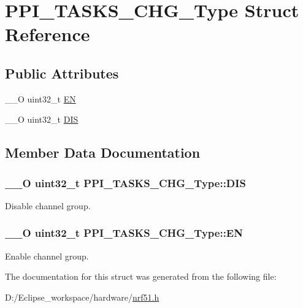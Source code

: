 \hypertarget{struct_p_p_i___t_a_s_k_s___c_h_g___type}{}\section{P\+P\+I\+\_\+\+T\+A\+S\+K\+S\+\_\+\+C\+H\+G\+\_\+\+Type Struct Reference}
\label{struct_p_p_i___t_a_s_k_s___c_h_g___type}
\subsection*{Public Attributes}
\begin{DoxyCompactItemize}
\item 
\+\_\+\+\_\+\+O uint32\+\_\+t \hyperlink{struct_p_p_i___t_a_s_k_s___c_h_g___type_ac25a33f2a32c9f7e6d4f6783a24936c3}{E\+N}
\item 
\+\_\+\+\_\+\+O uint32\+\_\+t \hyperlink{struct_p_p_i___t_a_s_k_s___c_h_g___type_a6197e7d3395fd93e920150ad965ff7d3}{D\+I\+S}
\end{DoxyCompactItemize}


\subsection{Member Data Documentation}
\hypertarget{struct_p_p_i___t_a_s_k_s___c_h_g___type_a6197e7d3395fd93e920150ad965ff7d3}{}
\subsubsection[{D\+I\+S}]{\setlength{\rightskip}{0pt plus 5cm}\+\_\+\+\_\+\+O uint32\+\_\+t P\+P\+I\+\_\+\+T\+A\+S\+K\+S\+\_\+\+C\+H\+G\+\_\+\+Type\+::\+D\+I\+S}\label{struct_p_p_i___t_a_s_k_s___c_h_g___type_a6197e7d3395fd93e920150ad965ff7d3}
Disable channel group. \hypertarget{struct_p_p_i___t_a_s_k_s___c_h_g___type_ac25a33f2a32c9f7e6d4f6783a24936c3}{}
\subsubsection[{E\+N}]{\setlength{\rightskip}{0pt plus 5cm}\+\_\+\+\_\+\+O uint32\+\_\+t P\+P\+I\+\_\+\+T\+A\+S\+K\+S\+\_\+\+C\+H\+G\+\_\+\+Type\+::\+E\+N}\label{struct_p_p_i___t_a_s_k_s___c_h_g___type_ac25a33f2a32c9f7e6d4f6783a24936c3}
Enable channel group. 

The documentation for this struct was generated from the following file\+:\begin{DoxyCompactItemize}
\item 
D\+:/\+Eclipse\+\_\+workspace/hardware/\hyperlink{nrf51_8h}{nrf51.\+h}\end{DoxyCompactItemize}
